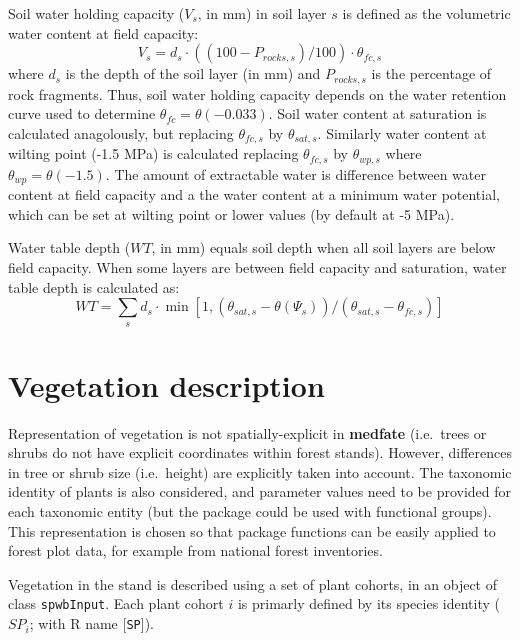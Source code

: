 \documentclass[]{book}
\begin{document}
Soil water holding capacity (\(V_s\), in mm) in soil layer \(s\) is defined as the volumetric water content at field capacity:
\begin{equation}
V_s = d_s\cdot ((100-P_{rocks,s})/100)\cdot\theta_{fc,s}
\end{equation}
where \(d_s\) is the depth of the soil layer (in mm) and \(P_{rocks,s}\) is the percentage of rock fragments. Thus, soil water holding capacity depends on the water retention curve used to determine \(\theta_{fc} = \theta(-0.033)\). Soil water content at saturation is calculated anagolously, but replacing \(\theta_{fc,s}\) by \(\theta_{sat,s}\). Similarly water content at wilting point (-1.5 MPa) is calculated replacing \(\theta_{fc,s}\) by \(\theta_{wp,s}\) where \(\theta_{wp} = \theta(-1.5)\). The amount of extractable water is difference between water content at field capacity and a the water content at a minimum water potential, which can be set at wilting point or lower values (by default at -5 MPa).

Water table depth (\(WT\), in mm) equals soil depth when all soil layers are below field capacity. When some layers are between field capacity and saturation, water table depth is calculated as:
\begin{equation}
WT = \sum_{s}{d_s \cdot \min\left[1,(\theta_{sat,s} - \theta(\Psi_s))/(\theta_{sat,s}-\theta_{fc,s})\right]}
\end{equation}

\hypertarget{vegetation-description}{%
\section{Vegetation description}\label{vegetation-description}}

Representation of vegetation is not spatially-explicit in \textbf{medfate} (i.e.~trees or shrubs do not have explicit coordinates within forest stands). However, differences in tree or shrub size (i.e.~height) are explicitly taken into account. The taxonomic identity of plants is also considered, and parameter values need to be provided for each taxonomic entity (but the package could be used with functional groups). This representation is chosen so that package functions can be easily applied to forest plot data, for example from national forest inventories.

Vegetation in the stand is described using a set of plant cohorts, in an object
of class \texttt{spwbInput}. Each plant cohort \(i\) is primarly defined by its
species identity (\(SP_i\); with R name {[}\texttt{SP}{]}).
\end{document}
